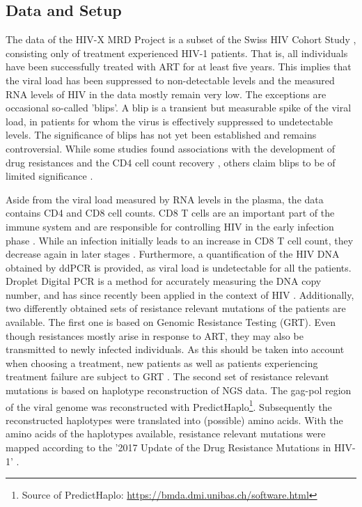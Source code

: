 \subsection{Data and Setup}
The data of the HIV-X MRD Project \citep{HIVX} is a subset of the Swiss HIV Cohort Study \citep{SHCS}, consisting only of treatment experienced HIV-1 patients.
That is, all individuals have been successfully treated with \gls{ART} for at least five years.
This implies that the viral load has been suppressed to non-detectable levels and the measured RNA levels of HIV in the data mostly remain very low.
The exceptions are occasional so-called 'blips'.
A blip is a transient but measurable spike of the viral load,
in patients for whom the virus is effectively suppressed to undetectable levels.
The significance of blips has not yet been established and remains controversial.
While some studies found associations with the development of drug resistances \citep{stuart2001transient} and the CD4 cell count recovery \citep{martinez2005hiv}, others claim blips to be of limited significance \citep{lee2006hiv}.

Aside from the viral load measured by RNA levels in the plasma, the data contains CD4 and CD8 cell counts.
CD8 T cells are an important part of the immune system and are responsible for controlling HIV in the early infection phase \citep{gulzar2004cd8}.
While an infection initially leads to an increase in CD8 T cell count, they decrease again in later stages \citep{roederer1995cd8}.
Furthermore, a quantification of the HIV DNA obtained by \gls{ddPCR} is provided, as viral load is undetectable for all the patients.
Droplet Digital PCR is a method for accurately measuring the DNA copy number, and has since recently been applied in the context of HIV \citep{strain2013highly}.
Additionally, two differently obtained sets of resistance relevant mutations of the patients are available.
The first one is based on Genomic Resistance Testing (GRT).
Even though resistances mostly arise in response to \gls{ART},
they may also be transmitted to newly infected individuals.
As this should be taken into account when choosing a treatment,
new patients as well as patients experiencing treatment failure are subject to \gls{GRT} \citep{shafer2002genotypic, huldrych_antiretroviralrecomm}.
The second set of resistance relevant mutations is based on haplotype
reconstruction of \gls{NGS} data.
The gag-pol region of the viral genome was reconstructed with
PredictHaplo\footnote{Source of PredictHaplo: \href{https://bmda.dmi.unibas.ch/software.html}{https://bmda.dmi.unibas.ch/software.html}}\citep{prabhakaran2014hiv}. Subsequently the reconstructed haplotypes were translated
into (possible) amino acids.
With the amino acids of the haplotypes available, resistance relevant mutations were mapped according to the '2017 Update of the Drug Resistance Mutations in HIV-1' \citep{shafer2017human}.

